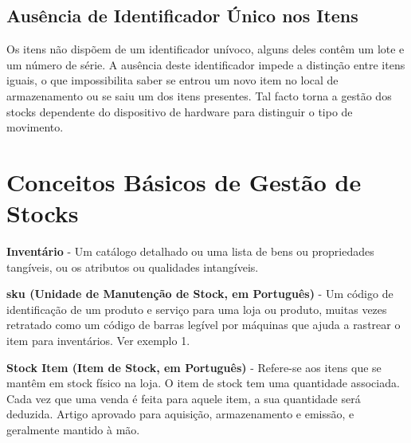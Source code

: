 \subsection{Ausência de Identificador Único nos Itens}

Os itens não dispõem de um identificador unívoco, alguns deles contêm um lote e um número de série. A ausência deste identificador impede a distinção entre itens iguais, o que impossibilita saber se entrou um novo item no local de armazenamento ou se saiu um dos itens presentes. Tal facto torna a gestão dos stocks dependente do dispositivo de hardware para distinguir o tipo de movimento.


%
%
\section{Conceitos Básicos de Gestão de Stocks} \label{sec24}
	
\vspace{0.2cm}
\textbf{Inventário} - Um catálogo detalhado ou uma lista de bens ou propriedades tangíveis, ou os atributos ou qualidades intangíveis.


\vspace{0.2cm}
\textbf{\acrfull{sku} (Unidade de Manutenção de Stock, em Português)} - Um código de identificação de um produto e serviço para uma loja ou produto, muitas vezes retratado como um código de barras legível por máquinas que ajuda a rastrear o item para inventários. Ver exemplo 1.



\vspace{0.2cm}
\textbf{Stock Item (Item de Stock, em Português)} - Refere-se aos itens que se mantêm em stock físico na loja. O item de stock tem uma quantidade associada. Cada vez que uma venda é feita para aquele item, a sua quantidade será deduzida. 
Artigo aprovado para aquisição, armazenamento e emissão, e geralmente mantido à mão.


